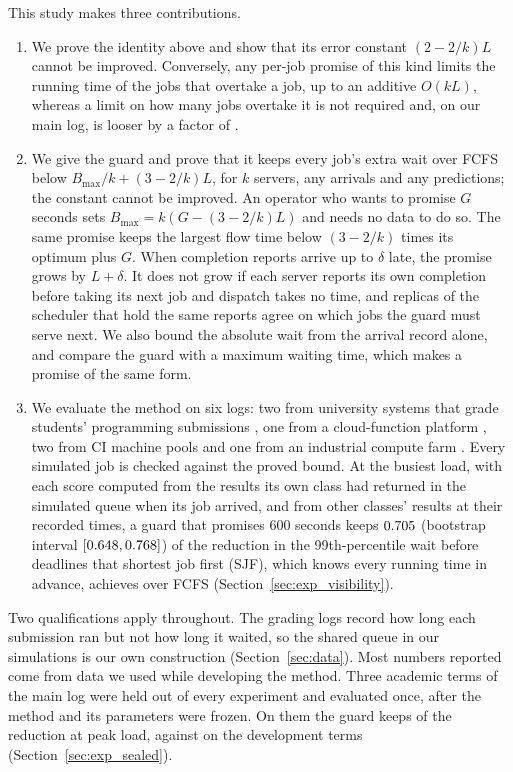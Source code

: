 This study makes three contributions.
\begin{enumerate}
  \item We prove the identity above and show that its error constant $(2-2/k)L$ cannot be
  improved. Conversely, any per-job promise of this kind limits the running time of the
  jobs that overtake a job, up to an additive $O(kL)$, whereas a limit on how many jobs
  overtake it is not required and, on our main log, is looser by a factor of
  .
  \item We give the guard and prove that it keeps every job's extra wait over FCFS below
  $B_{\max}/k + (3-2/k)L$, for $k$ servers, any arrivals and any predictions; the constant
  cannot be improved. An operator who wants to promise $G$ seconds sets
  $B_{\max} = k(G - (3-2/k)L)$ and needs no data to do so. The same promise keeps the
  largest flow time below $(3-2/k)$ times its optimum plus $G$. When completion reports arrive
  up to $\delta$ late, the promise grows by $L + \delta$. It does not grow if each server
  reports its own completion before taking its next job and dispatch takes no time, and
  replicas of the scheduler that hold the same reports agree on which jobs the guard must
  serve next. We also bound the
  absolute wait from the arrival record alone, and compare the guard with a maximum
  waiting time, which makes a promise of the same form.
  \item We evaluate the method on six logs: two from university systems that grade
  students' programming submissions \cite{codebench_dataset,accoding2024}, one from a
  cloud-function platform \cite{azure2021trace}, two from CI machine pools
  \cite{taskcluster_docs,treeherder_docs} and one from an industrial compute farm
  \cite{netbatch2012trace,shai2014netbatch}. Every simulated job is checked against the
  proved bound. At the busiest load, with each score computed from the results its own
  class had returned in the simulated queue when its job arrived, and from other classes'
  results at their recorded times, a guard that promises 600 seconds keeps
  $0.705$ (bootstrap interval $[0.648, 0.768]$) of the reduction in
  the 99th-percentile wait before deadlines that shortest job first (SJF), which knows
  every running time in advance, achieves over FCFS (Section~\ref{sec:exp_visibility}).
\end{enumerate}

Two qualifications apply throughout. The grading logs record how long each submission
ran but not how long it waited, so the shared queue in our simulations is our own
construction (Section~\ref{sec:data}). Most numbers reported come from data we used while
developing the method. Three academic terms of the main log were held out of every
experiment and evaluated once, after the method and its parameters were frozen. On them the guard keeps
 of the reduction at peak load, against  on the development
terms (Section~\ref{sec:exp_sealed}).


